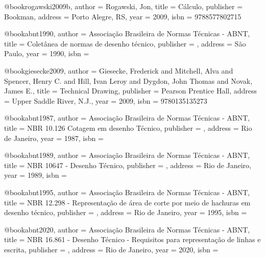 @book{rogawski2009b,
  author = {Rogawski, Jon},
  title = {Cálculo},
  publisher = {Bookman},
  address = {Porto Alegre, RS},
  year = {2009},
  isbn = {9788577802715}
}

%

@book{abnt1990,
  author = {{Associação Brasileira de Normas Técnicas - ABNT}},
  title = {Coletânea de normas de desenho técnico},
  publisher = {},
  address = {São Paulo},
  year = {1990},
  isbn = {}
}

@book{giesecke2009,
  author = {Giesecke, Frederick and Mitchell, Alva and Spencer, Henry C. and Hill, Ivan Leroy and Dygdon, John Thomas and Novak, James E.},
  title = {Technical Drawing},
  publisher = {Pearson Prentice Hall},
  address = {Upper Saddle River, N.J.},
  year = {2009},
  isbn = {9780135135273}
}

@book{abnt1987,
  author = {{Associação Brasileira de Normas Técnicas - ABNT}},
  title = {NBR 10.126 Cotagem em desenho Técnico},
  publisher = {},
  address = {Rio de Janeiro},
  year = {1987},
  isbn = {}
}

@book{abnt1989,
  author = {{Associação Brasileira de Normas Técnicas - ABNT}},
  title = {NBR 10647 - Desenho Técnico},
  publisher = {},
  address = {Rio de Janeiro},
  year = {1989},
  isbn = {}
}

@book{abnt1995,
  author = {{Associação Brasileira de Normas Técnicas - ABNT}},
  title = {NBR 12.298 - Representação de área de corte por meio de hachuras em desenho técnico},
  publisher = {},
  address = {Rio de Janeiro},
  year = {1995},
  isbn = {}
}

@book{abnt2020,
  author = {{Associação Brasileira de Normas Técnicas - ABNT}},
  title = {NBR 16.861 - Desenho Técnico - Requisitos para representação de linhas e escrita},
  publisher = {},
  address = {Rio de Janeiro},
  year = {2020},
  isbn = {}
}


